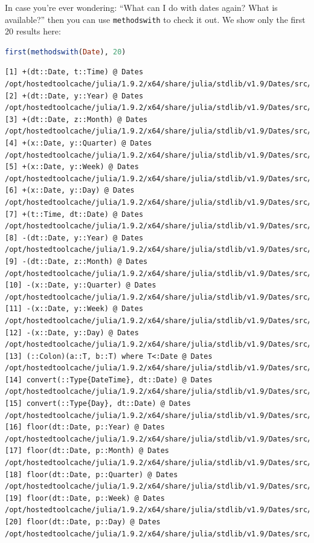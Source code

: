 \documentclass[
  notoc %
]{tufte-book}
\newcommand{\passthrough}[1]{#1}
\begin{document}
In case you're ever wondering: ``What can I do with dates again? What is
available?'' then you can use \passthrough{\lstinline!methodswith!} to
check it out. We show only the first 20 results here:

\begin{lstlisting}[language=Julia]
first(methodswith(Date), 20)
\end{lstlisting}

\begin{lstlisting}[language=Output]
[1] +(dt::Date, t::Time) @ Dates /opt/hostedtoolcache/julia/1.9.2/x64/share/julia/stdlib/v1.9/Dates/src/arithmetic.jl:19
[2] +(dt::Date, y::Year) @ Dates /opt/hostedtoolcache/julia/1.9.2/x64/share/julia/stdlib/v1.9/Dates/src/arithmetic.jl:27
[3] +(dt::Date, z::Month) @ Dates /opt/hostedtoolcache/julia/1.9.2/x64/share/julia/stdlib/v1.9/Dates/src/arithmetic.jl:54
[4] +(x::Date, y::Quarter) @ Dates /opt/hostedtoolcache/julia/1.9.2/x64/share/julia/stdlib/v1.9/Dates/src/arithmetic.jl:73
[5] +(x::Date, y::Week) @ Dates /opt/hostedtoolcache/julia/1.9.2/x64/share/julia/stdlib/v1.9/Dates/src/arithmetic.jl:77
[6] +(x::Date, y::Day) @ Dates /opt/hostedtoolcache/julia/1.9.2/x64/share/julia/stdlib/v1.9/Dates/src/arithmetic.jl:79
[7] +(t::Time, dt::Date) @ Dates /opt/hostedtoolcache/julia/1.9.2/x64/share/julia/stdlib/v1.9/Dates/src/arithmetic.jl:20
[8] -(dt::Date, y::Year) @ Dates /opt/hostedtoolcache/julia/1.9.2/x64/share/julia/stdlib/v1.9/Dates/src/arithmetic.jl:35
[9] -(dt::Date, z::Month) @ Dates /opt/hostedtoolcache/julia/1.9.2/x64/share/julia/stdlib/v1.9/Dates/src/arithmetic.jl:66
[10] -(x::Date, y::Quarter) @ Dates /opt/hostedtoolcache/julia/1.9.2/x64/share/julia/stdlib/v1.9/Dates/src/arithmetic.jl:74
[11] -(x::Date, y::Week) @ Dates /opt/hostedtoolcache/julia/1.9.2/x64/share/julia/stdlib/v1.9/Dates/src/arithmetic.jl:78
[12] -(x::Date, y::Day) @ Dates /opt/hostedtoolcache/julia/1.9.2/x64/share/julia/stdlib/v1.9/Dates/src/arithmetic.jl:80
[13] (::Colon)(a::T, b::T) where T<:Date @ Dates /opt/hostedtoolcache/julia/1.9.2/x64/share/julia/stdlib/v1.9/Dates/src/ranges.jl:7
[14] convert(::Type{DateTime}, dt::Date) @ Dates /opt/hostedtoolcache/julia/1.9.2/x64/share/julia/stdlib/v1.9/Dates/src/conversions.jl:30
[15] convert(::Type{Day}, dt::Date) @ Dates /opt/hostedtoolcache/julia/1.9.2/x64/share/julia/stdlib/v1.9/Dates/src/conversions.jl:37
[16] floor(dt::Date, p::Year) @ Dates /opt/hostedtoolcache/julia/1.9.2/x64/share/julia/stdlib/v1.9/Dates/src/rounding.jl:45
[17] floor(dt::Date, p::Month) @ Dates /opt/hostedtoolcache/julia/1.9.2/x64/share/julia/stdlib/v1.9/Dates/src/rounding.jl:51
[18] floor(dt::Date, p::Quarter) @ Dates /opt/hostedtoolcache/julia/1.9.2/x64/share/julia/stdlib/v1.9/Dates/src/rounding.jl:61
[19] floor(dt::Date, p::Week) @ Dates /opt/hostedtoolcache/julia/1.9.2/x64/share/julia/stdlib/v1.9/Dates/src/rounding.jl:66
[20] floor(dt::Date, p::Day) @ Dates /opt/hostedtoolcache/julia/1.9.2/x64/share/julia/stdlib/v1.9/Dates/src/rounding.jl:73
\end{lstlisting}
\end{document}
